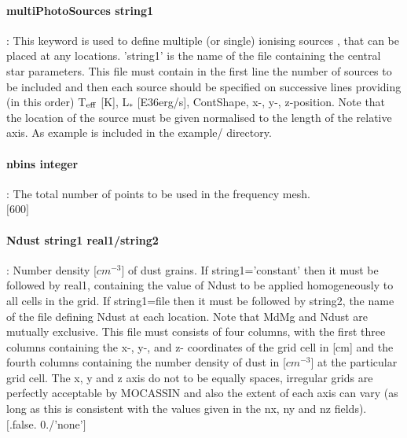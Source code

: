 \documentclass[11pt]{article}
\begin{document}
\paragraph    {multiPhotoSources string1} : This keyword is used to define multiple (or single) ionising sources , that can be placed at any locations. 'string1' is the name of the file containing the central star parameters. This file must contain in the first line the number of sources to be included and then each source should be specified on successive lines providing (in this order) T$_{\rm eff}$ [K], L$_*$ [E36erg/s], ContShape, x-, y-, z-position. Note that the location of the source must be given normalised to the length of the relative axis. As example is included in the example/ directory. \\

\paragraph    {nbins integer  }  : The total number of points to be used in the frequency mesh. \\
		     $[$600$]$\\

\paragraph    {Ndust string1 real1/string2 }: Number density [$cm^{-3}$] of dust grains. If 
                     string1='constant' then it must be followed by real1, containing 
                     the value of Ndust to be applied homogeneously to all cells in the 
                     grid. If string1=file then it must be followed by string2, the name of 
                     the file defining Ndust at each location. Note that MdMg and Ndust are 
		     mutually exclusive. This file must consists of four columns, with the first three 
		     columns containing the x-, y-, and z- coordinates of the grid cell in 
		     [cm] and the fourth columns containing the number density of dust
                     in [$cm^{-3}$] at the particular grid cell. The 
		     x, y and z axis do not to be equally spaces, irregular grids are 
		     perfectly acceptable by MOCASSIN and also the extent of each axis 
		     can vary (as long as this is consistent with the values given in 
		     the nx, ny and nz fields).\\
		     $[$.false. 0./'none'$]$\\
\end{document}
